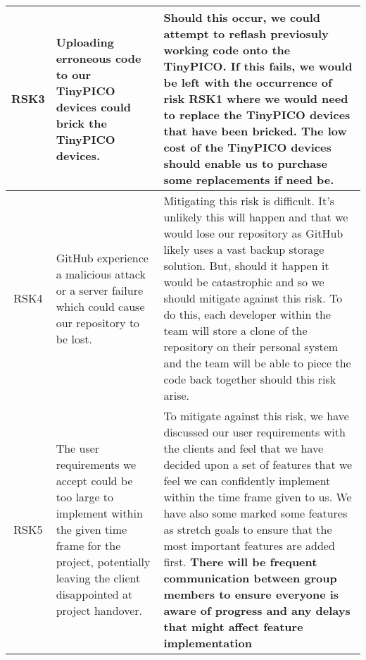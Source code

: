 \begin{xltabular}[H]{\textwidth}{c | X | X}
    RSK3

    &

    Uploading erroneous code to our TinyPICO devices could brick the TinyPICO devices.

    &

    Should this occur, we could attempt to reflash previosuly working code onto the TinyPICO. If this fails, we would be left with the occurrence of risk RSK1 where we would need to replace the TinyPICO devices that have been bricked. The low cost of the TinyPICO devices should enable us to purchase some replacements if need be.\\

    \midrule

    RSK4

    &

    GitHub experience a malicious attack or a server failure which could cause our repository to be lost.

    &

    Mitigating this risk is difficult. It's unlikely this will happen and that we would lose our repository as GitHub likely uses a vast backup storage solution. But, should it happen it would be catastrophic and so we should mitigate against this risk. To do this, each developer within the team will store a clone of the repository on their personal system and the team will be able to piece the code back together should this risk arise.\\

    \midrule

    RSK5

    &

    The user requirements we accept could be too large to implement within the given time frame for the project, potentially leaving the client disappointed at project handover.

    &

    To mitigate against this risk, we have discussed our user requirements with the clients and feel that we have decided upon a set of features that we feel we can confidently implement within the time frame given to us. We have also some marked some features as stretch goals to ensure that the most important features are added first. \textbf{There will be frequent communication between group members to ensure everyone is aware of progress and any delays that might affect feature implementation }\\

    \midrule


\end{xltabular}
